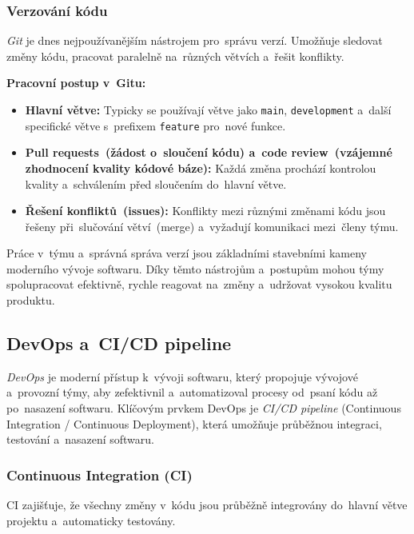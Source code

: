 \documentclass[male,czech,api_bc]{kitheses}
\begin{document}
\subsubsection{Verzování kódu}

\textit{Git} je dnes nejpoužívanějším nástrojem pro~správu verzí. Umožňuje sledovat změny kódu, pracovat paralelně na~různých větvích a~řešit konflikty.

\textbf{Pracovní postup v~Gitu:}
\begin{itemize}
	\item \textbf{Hlavní větve:} Typicky se používají větve jako \texttt{main}, \texttt{development} a~další specifické větve s~prefixem \texttt{feature} pro~nové funkce.
	\item \textbf{Pull requests~(žádost o~sloučení kódu) a~code review~(vzájemné zhodnocení kvality kódové báze):} Každá změna prochází kontrolou kvality a~schválením před sloučením do~hlavní větve.
	\item \textbf{Řešení konfliktů~(issues):} Konflikty mezi různými změnami kódu jsou řešeny při~slučování větví~(merge) a~vyžadují komunikaci mezi~členy týmu.
\end{itemize}

Práce v~týmu a~správná správa verzí jsou základními stavebními kameny moderního vývoje softwaru. Díky těmto nástrojům a~postupům mohou týmy spolupracovat efektivně, rychle reagovat na~změny a~udržovat vysokou kvalitu produktu.

\subsection{DevOps a~CI/CD pipeline}

\textit{DevOps} je moderní přístup k~vývoji softwaru, který propojuje vývojové a~provozní týmy, aby zefektivnil a~automatizoval procesy od~psaní kódu až po~nasazení softwaru. Klíčovým prvkem DevOps je \textit{CI/CD pipeline} (Continuous Integration / Continuous Deployment), která umožňuje průběžnou integraci, testování a~nasazení softwaru.

\newpage

\subsubsection{Continuous Integration (CI)}

CI zajišťuje, že všechny změny v~kódu jsou průběžně integrovány do~hlavní větve projektu a~automaticky testovány.
\end{document}
